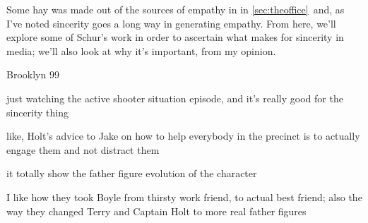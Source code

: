 \documentclass[../butidigress.tex]{subfiles}
\begin{document}
Some hay was made out of the sources of empathy in  in \ref{sec:theoffice}\ and, as I've noted sincerity goes a long way in generating empathy.
From here, we'll explore some of Schur's work in order to ascertain what makes for sincerity in media; we'll also look at why it's important, from my opinion.



\begin{somenotes}{Brooklyn 99}
    \item just watching the active shooter situation episode, and it's really good for the sincerity thing
    \item like, Holt's advice to Jake on how to help everybody in the precinct is to actually engage them and not distract them
    \item it totally show the father figure evolution of the character
    \item I like how they took Boyle from thirsty work friend, to actual best friend; also the way they changed Terry and Captain Holt to more real father figures
\end{somenotes}
\end{document}
